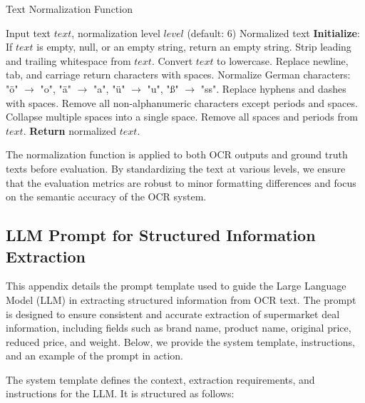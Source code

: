 \documentclass[11pt]{article}
\begin{document}
\begin{algorithm}[H]
\caption{Text Normalization Function}
\label{alg:normalization}
\begin{algorithmic}[1]
\Require Input text $text$, normalization level $level$ (default: 6)
\Ensure Normalized text
\State \textbf{Initialize}: If $text$ is empty, null, or an empty string, return an empty string.
    \State Strip leading and trailing whitespace from $text$.
\EndIf
{}
    \State Convert $text$ to lowercase.
    \State Replace newline, tab, and carriage return characters with spaces.
    \State Normalize German characters: "ö" $\rightarrow$ "o", "ä" $\rightarrow$ "a", "ü" $\rightarrow$ "u", "ß" $\rightarrow$ "ss".
\EndIf
{}
    \State Replace hyphens and dashes  with spaces.
    \State Remove all non-alphanumeric characters except periods and spaces.
    \State Collapse multiple spaces into a single space.
\EndIf
{}
    \State Remove all spaces and periods from $text$.
\EndIf
\State \textbf{Return} normalized $text$.
\end{algorithmic}
\end{algorithm}

The normalization function is applied to both OCR outputs and ground truth texts before evaluation. By standardizing the text at various levels, we ensure that the evaluation metrics are robust to minor formatting differences and focus on the semantic accuracy of the OCR system.

\subsection{LLM Prompt for Structured Information Extraction}
\label{app:llm_prompt}

This appendix details the prompt template used to guide the Large Language Model (LLM) in extracting structured information from OCR text. The prompt is designed to ensure consistent and accurate extraction of supermarket deal information, including fields such as brand name, product name, original price, reduced price, and weight. Below, we provide the system template, instructions, and an example of the prompt in action.

The system template defines the context, extraction requirements, and instructions for the LLM. It is structured as follows:
\end{document}
